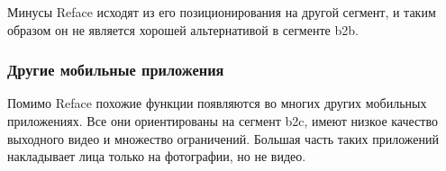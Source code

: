 Минусы Reface исходят из его позиционирования на другой сегмент, и таким образом он не является хорошей альтернативой в сегменте b2b.

\subsubsection{Другие мобильные приложения}

Помимо Reface похожие функции появляются во многих других мобильных приложениях. Все они ориентированы на сегмент b2c, имеют низкое качество выходного видео и множество ограничений.
Большая часть таких приложений накладывает лица только на фотографии, но не видео.